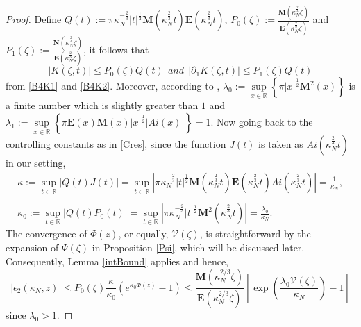 \documentclass[11pt]{article}
\numberwithin{equation}{section}%
\numberwithin{theorem}{section}
\begin{document}
\begin{proof}
    Define $Q(t):=\pi\kappa_N^{-\frac{2}{3}}|t|^\frac{1}{2}\mathbf{M}\left(\kappa_N^\frac{2}{3}t\right)\mathbf{E}\left(\kappa_N^\frac{2}{3}t\right)$, $P_0(\zeta):=\frac{\mathbf{M}\left(\kappa_N^\frac{2}{3}\zeta\right)}{\mathbf{E}\left(\kappa_N^\frac{2}{3}\zeta\right)}$ and $P_1(\zeta):=\frac{\mathbf{N}\left(\kappa_N^\frac{2}{3}\zeta\right)}{\mathbf{E}\left(\kappa_N^\frac{2}{3}\zeta\right)}$, it follows that
    \begin{equation*}
        |K(\zeta,t)|\le P_0(\zeta)Q(t)~~and~~|\partial_1K(\zeta,t)|\le P_1(\zeta)Q(t)
    \end{equation*}
    from \eqref{B4K1} and \eqref{B4K2}. Moreover, according to \cite[Equation $(11.2.15)$]{olver1997asymptotics}, $\lambda_0:=\sup\limits_{x\in\mathbb{R}}\left\{\pi\left|x\right|^\frac{1}{2}\mathbf{M}^2(x)\right\}$ is a finite number which is slightly greater than $1$ and $\lambda_1:=\sup\limits_{x\in\mathbb{R}}\left\{\pi\mathbf{E}(x)\mathbf{M}(x)\left|x\right|^\frac{1}{2}|Ai(x)|\right\}=1$. Now going back to the controlling constants as in \eqref{Cres}, since the function $J(t)$ is taken as $Ai\left(\kappa_N^\frac{2}{3}t\right)$ in our setting,
    \begin{equation*}
 \begin{array}{cc}
\kappa:=\sup\limits_{t\in\mathbb{R}}|Q(t)J(t)|=\sup\limits_{t\in\mathbb{R}}\left|\pi\kappa_N^{-\frac{2}{3}}|t|^\frac{1}{2}\mathbf{M}\left(\kappa_N^\frac{2}{3}t\right)\mathbf{E}\left(\kappa_N^\frac{2}{3}t\right)Ai\left(\kappa_N^\frac{2}{3}t\right)\right|=\frac{1}{\kappa_N},\\
\\
\kappa_0:=\sup\limits_{t\in\mathbb{R}}|Q(t)P_0(t)|=\sup\limits_{t\in\mathbb{R}}\left|\pi\kappa_N^{-\frac{2}{3}}|t|^\frac{1}{2}\mathbf{M}^2\left(\kappa_N^\frac{2}{3}t\right)\right|=\frac{\lambda_0}{\kappa_N}.
\end{array}
\end{equation*}
The convergence of $\Phi(z)$, or equally, $\mathcal{V}(\zeta)$, is straightforward by the expansion of $\Psi(\zeta)$ in Proposition \ref{Psi}, which will be discussed later. Consequently, Lemma \ref{intBound} applies and hence,
\begin{equation*}
    |\epsilon_2(\kappa_N,z)|\le P_0(\zeta)\frac{\kappa}{\kappa_0}\left(e^{\kappa_0\Phi(z)}-1\right)\le\frac{\mathbf{M}(\kappa_N^{2/3}\zeta)}{\mathbf{E}(\kappa_N^{2/3}\zeta)}\left[\exp\left(\frac{\lambda_0 \mathcal{V}(\zeta)}{\kappa_N}\right)-1\right]
\end{equation*}
since $\lambda_0>1$.
\end{proof}
\end{document}
